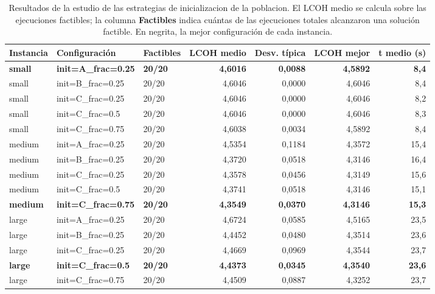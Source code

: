 \begin{table}[H]
    \centering
    \small
    \renewcommand{\arraystretch}{1.25}
    \begin{tabular}{lllrrrr}
        \hline
        \textbf{Instancia} & \textbf{Configuración} & \textbf{Factibles} & \textbf{LCOH medio} & \textbf{Desv. típica} & \textbf{LCOH mejor} & \textbf{t medio (s)} \\
        \hline
        \textbf{small} & \textbf{init=A\_frac=0.25} & \textbf{20/20} & \textbf{4,6016} & \textbf{0,0088} & \textbf{4,5892} & \textbf{8,4} \\
        small & init=B\_frac=0.25 & 20/20 & 4,6046 & 0,0000 & 4,6046 & 8,4 \\
        small & init=C\_frac=0.25 & 20/20 & 4,6046 & 0,0000 & 4,6046 & 8,2 \\
        small & init=C\_frac=0.5 & 20/20 & 4,6046 & 0,0000 & 4,6046 & 8,3 \\
        small & init=C\_frac=0.75 & 20/20 & 4,6038 & 0,0034 & 4,5892 & 8,4 \\
        \hline
        medium & init=A\_frac=0.25 & 20/20 & 4,5354 & 0,1184 & 4,3572 & 15,4 \\
        medium & init=B\_frac=0.25 & 20/20 & 4,3720 & 0,0518 & 4,3146 & 16,4 \\
        medium & init=C\_frac=0.25 & 20/20 & 4,3578 & 0,0456 & 4,3149 & 15,6 \\
        medium & init=C\_frac=0.5 & 20/20 & 4,3741 & 0,0518 & 4,3146 & 15,1 \\
        \textbf{medium} & \textbf{init=C\_frac=0.75} & \textbf{20/20} & \textbf{4,3549} & \textbf{0,0370} & \textbf{4,3146} & \textbf{15,3} \\
        \hline
        large & init=A\_frac=0.25 & 20/20 & 4,6724 & 0,0585 & 4,5165 & 23,5 \\
        large & init=B\_frac=0.25 & 20/20 & 4,4452 & 0,0480 & 4,3514 & 23,6 \\
        large & init=C\_frac=0.25 & 20/20 & 4,4669 & 0,0969 & 4,3544 & 23,7 \\
        \textbf{large} & \textbf{init=C\_frac=0.5} & \textbf{20/20} & \textbf{4,4373} & \textbf{0,0345} & \textbf{4,3540} & \textbf{23,6} \\
        large & init=C\_frac=0.75 & 20/20 & 4,4509 & 0,0887 & 4,3252 & 23,7 \\
        \hline
    \end{tabular}
    \caption{Resultados de la estudio de las estrategias de inicializacion de la poblacion. El LCOH medio se calcula sobre las ejecuciones factibles; la columna \textbf{Factibles} indica cuántas de las ejecuciones totales alcanzaron una solución factible. En negrita, la mejor configuración de cada instancia.}
    \label{tab:calib_e08_init}
\end{table}
